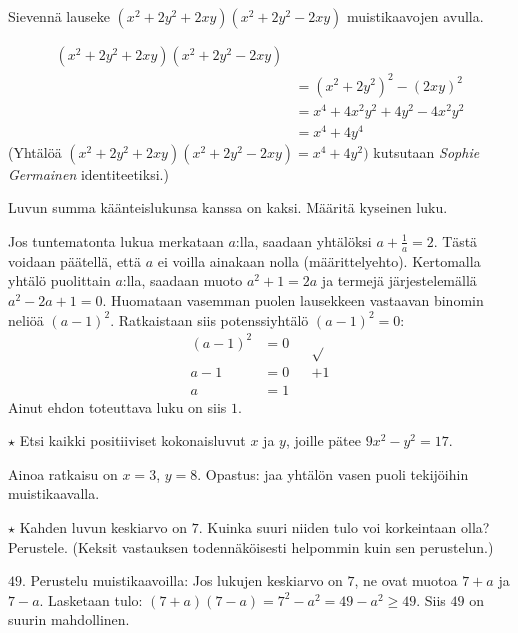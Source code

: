 \begin{tehtavasivu}
\begin{tehtava}
Sievennä lauseke $(x^2+2y^2+2xy)(x^2+2y^2-2xy)$ muistikaavojen avulla.
	\begin{vastaus}
	\begin{align*}
		(x^2+2y^2+2xy)(x^2+2y^2-2xy) \\
		&=(x^2+2y^2)^2-(2xy)^2 \\
		&=x^4+4x^2y^2+4y^2-4x^2y^2 \\
		&=x^4+4y^4
	\end{align*}		
	(Yhtälöä $(x^2+2y^2+2xy)(x^2+2y^2-2xy)=x^4+4y^2)$ kutsutaan \textit{Sophie Germainen} identiteetiksi.)
	\end{vastaus}
\end{tehtava}

\begin{tehtava}
Luvun summa käänteislukunsa kanssa on kaksi. Määritä kyseinen luku.
	\begin{vastaus}
	Jos tuntematonta lukua merkataan $a$:lla, saadaan yhtälöksi $a+\frac{1}{a}=2$. Tästä voidaan päätellä, että $a$ ei voilla ainakaan nolla (määrittelyehto). Kertomalla yhtälö puolittain $a$:lla, saadaan muoto $a^2+1=2a$ ja termejä järjestelemällä $a^2-2a+1=0$. Huomataan vasemman puolen lausekkeen vastaavan binomin neliöä $(a-1)^2$. Ratkaistaan siis potenssiyhtälö $(a-1)^2=0$:
	\begin{align*}
(a-1)^2&=0 &&\sqrt{ } \\
a-1&=0 &&+1 \\
a&=1 &&
	\end{align*}
	Ainut ehdon toteuttava luku on siis $1$.
	\end{vastaus}
\end{tehtava}

\begin{tehtava}
    $\star$ Etsi kaikki positiiviset kokonaisluvut $x$ ja $y$, joille pätee $9x^2-y^2=17$.
    \begin{vastaus}
    Ainoa ratkaisu on $x = 3$, $y=8$. Opastus: jaa yhtälön vasen puoli tekijöihin muistikaavalla. 
    \end{vastaus}
\end{tehtava}

\begin{tehtava}
    $\star$ Kahden luvun keskiarvo on $7$. Kuinka suuri niiden tulo voi korkeintaan olla? Perustele. (Keksit vastauksen todennäköisesti helpommin kuin sen perustelun.)
    \begin{vastaus}
        $49$. Perustelu muistikaavoilla: Jos lukujen keskiarvo on $7$, ne ovat muotoa $7+a$ ja $7-a$. Lasketaan tulo: $(7+a)(7-a)=7^2-a^2 = 49-a^2 \geq 49$. Siis $49$ on suurin mahdollinen.
    \end{vastaus}
\end{tehtava}

\end{tehtavasivu}